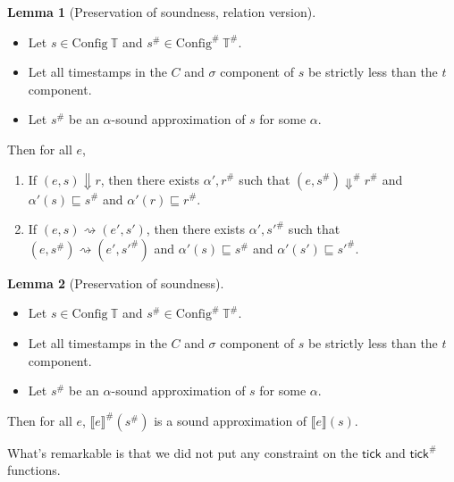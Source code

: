 \documentclass{article}
\theoremstyle{definition}
\newtheorem{lem}{Lemma}[section]
\newcommand*{\A}[1]{{#1}^{\#}}
\newcommand*{\Time}{\mathbb{T}}
\newcommand*{\ATime}{\A{\Time}}
\newcommand*{\Config}[1]{\text{Config}\:{#1}}
\newcommand*{\AConfig}[1]{\A{\text{Config}}\:{#1}}
\newcommand*{\sembracket}[1]{\lBrack{#1}\rBrack}
\newcommand*{\tick}{\mathsf{tick}}
\begin{document}
\begin{lem}[Preservation of soundness, relation version]
  $\:$

  \begin{itemize}
    \item Let $s\in\Config{\Time}$ and $\A{s}\in\AConfig{\ATime}$.
    \item Let all timestamps in the $C$ and $\sigma$ component of $s$ be strictly less than the $t$ component.
    \item Let $\A{s}$ be an $\alpha$-sound approximation of $s$ for some $\alpha$.
  \end{itemize}

  Then for all $e$, 
  \begin{enumerate}
    \item If $(e,s)\Downarrow r$, then there exists $\alpha',\A{r}$ such that $(e,\A{s})\A\Downarrow\A{r}$ and $\alpha'(s)\sqsubseteq\A{s}$ and $\alpha'(r)\sqsubseteq\A{r}$.
    \item If $(e,s)\rightsquigarrow (e',s')$, then there exists $\alpha', \A{s'}$ such that $(e,\A{s})\rightsquigarrow(e',\A{s'})$ and $\alpha'(s)\sqsubseteq\A{s}$ and $\alpha'(s')\sqsubseteq\A{s'}$.
  \end{enumerate}
\end{lem}

\begin{lem}[Preservation of soundness]
  $\:$

  \begin{itemize}
    \item Let $s\in\Config{\Time}$ and $\A{s}\in\AConfig{\ATime}$.
    \item Let all timestamps in the $C$ and $\sigma$ component of $s$ be strictly less than the $t$ component.
    \item Let $\A{s}$ be an $\alpha$-sound approximation of $s$ for some $\alpha$.
  \end{itemize}

  Then for all $e$, $\A{\sembracket{e}}(\A{s})$ is a sound approximation of $\sembracket{e}(s)$.
\end{lem}

What's remarkable is that we did not put any constraint on the $\tick$ and $\A{\tick}$ functions.
\end{document}
